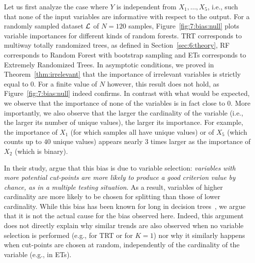 Let us first analyze the case where $Y$ is independent from $X_1, \dots, X_5$,
i.e., such that none of the input variables are informative with respect to the
output. For a randomly sampled dataset ${\cal L}$ of $N=120$ samples,
Figure~\ref{fig:7:bias:null} plots variable importances for different kinds of
random forests. TRT corresponds to multiway totally randomized trees, as
defined in Section~\ref{sec:6:theory}, RF corresponds to Random Forest with
bootstrap sampling and ETs corresponds to Extremely Randomized Trees. In
asymptotic conditions, we proved in Theorem~\ref{thm:irrelevant} that the
importance of irrelevant variables is strictly equal to $0$. For a finite value
of $N$ however, this result does not hold, as Figure~\ref{fig:7:bias:null}
indeed confirms. In contrast with what would be expected, we observe that the
importance of none of the variables is in fact close to $0$. More importantly,
we also observe that the larger the cardinality of the variable (i.e., the
larger its number of unique values), the larger its importance. For example,
the importance of $X_1$ (for which samples all have unique values) or of $X_5$
(which counts up to $40$ unique values) appears nearly $3$ times larger as the
importance of $X_2$ (which is binary).

In their study, \citet{strobl:2007b} argue that this bias is due to variable
selection: \textit{variables with more potential cut-points are more likely to
produce a good criterion value by chance, as in a multiple testing situation}.
As a result, variables of higher cardinality are more likely to be chosen for
splitting than those of lower cardinality. While this bias has been known for
long in decision trees~\citep{kononenko:1995,kim:2001,hothorn:2006}, we argue
that it is not the actual cause for the bias observed here. Indeed, this
argument does not directly explain why similar trends are also observed when no
variable selection is performed (e.g., for TRT or for $K=1$) nor why it
similarly happens when cut-points are chosen at random, independently of the
cardinality of the variable (e.g., in ETs).

